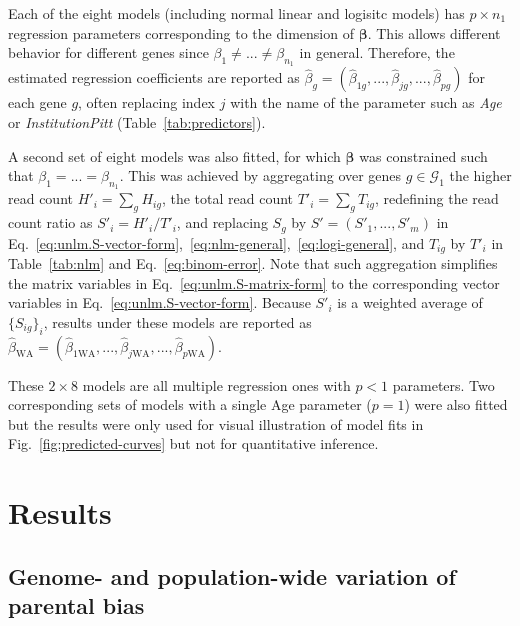 \documentclass[letterpaper]{article}
\begin{document}
Each of the eight models (including normal linear and logisitc models) has \(p\times n_1\) regression parameters corresponding to the
dimension of \(\boldsymbol{\beta}\).  This allows different behavior for
different genes since \(\beta_1\neq ...\neq\beta_{n_1}\) in general.
Therefore, the estimated regression coefficients are reported as \(\hat{\beta}_g =
(\hat{\beta}_{1g},...,\hat{\beta}_{jg},...,\hat{\beta}_{pg})\) for each gene \(g\), often
replacing index \(j\) with the name of the parameter such as \emph{Age} or
\emph{InstitutionPitt} (Table~\ref{tab:predictors}).

A second set of eight models was also
fitted, for which \(\boldsymbol{\beta}\) was constrained such that \(\beta_1 =
... = \beta_{n_1}\).  This was achieved by aggregating over genes
\(g\in\mathcal{G}_1\) the higher read count \(H'_i = \sum_g H_{ig}\), the
total read count \(T'_i = \sum_g T_{ig}\), redefining the read count ratio
as \(S'_i = H'_i / T'_i\), and replacing \(S_g\) by \(S'=(S'_1,...,S'_m)\) in
Eq.~\ref{eq:unlm.S-vector-form},~\ref{eq:nlm-general},~\ref{eq:logi-general}, and \(T_{ig}\) by \(T'_i\) in
Table~\ref{tab:nlm} and Eq.~\ref{eq:binom-error}.  Note that such aggregation
simplifies the matrix variables in Eq.~\ref{eq:unlm.S-matrix-form} to the
corresponding vector variables in Eq.~\ref{eq:unlm.S-vector-form}.  Because \(S'_i\) is a
weighted average of \(\{S_{ig}\}_i\), results under these models are reported
as \(\hat{\beta}_\mathrm{WA} =
(\hat{\beta}_{1\mathrm{WA}},...,\hat{\beta}_{j\mathrm{WA}},...,\hat{\beta}_{p\mathrm{WA}})\).

These \(2\times 8\) models are all multiple regression ones with \(p<1\)
parameters.  Two corresponding sets of models with a single Age parameter
(\(p=1\)) were also fitted but the results were only used for visual
illustration of model fits in Fig.~\ref{fig:predicted-curves} but not for
quantitative inference.

\section{Results}

\subsection{Genome- and population-wide variation of parental bias}
\end{document}
